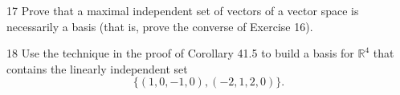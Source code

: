 \begin{problem}{17}
    Prove that a maximal independent set of vectors of a vector space is necessarily a
    basis (that is, prove the converse of Exercise 16).
\end{problem}
\unsolved

\begin{problem}{18}
    Use the technique in the proof of Corollary 41.5 to build a basis for $\mathbb{R}^4$
    that contains the linearly independent set
    \[\{(1, 0, -1, 0), (-2, 1, 2, 0)\}.\]
\end{problem}
\unsolved
